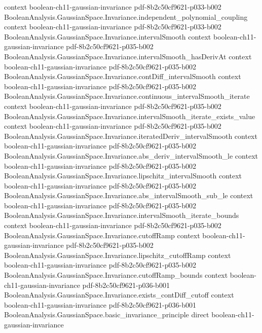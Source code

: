 \begin{theorem}
  {context}
  {boolean-ch11-gaussian-invariance}
  {pdf-8b2c50cf9621-p033-b002}
\proofstep
  {BooleanAnalysis.GaussianSpace.Invariance.independent_polynomial_coupling}
  {context}
  {boolean-ch11-gaussian-invariance}
  {pdf-8b2c50cf9621-p033-b002}
\proofstep
  {BooleanAnalysis.GaussianSpace.Invariance.intervalSmooth}
  {context}
  {boolean-ch11-gaussian-invariance}
  {pdf-8b2c50cf9621-p035-b002}
\proofstep
  {BooleanAnalysis.GaussianSpace.Invariance.intervalSmooth_hasDerivAt}
  {context}
  {boolean-ch11-gaussian-invariance}
  {pdf-8b2c50cf9621-p035-b002}
\proofstep
  {BooleanAnalysis.GaussianSpace.Invariance.contDiff_intervalSmooth}
  {context}
  {boolean-ch11-gaussian-invariance}
  {pdf-8b2c50cf9621-p035-b002}
\proofstep
  {BooleanAnalysis.GaussianSpace.Invariance.continuous_intervalSmooth_iterate}
  {context}
  {boolean-ch11-gaussian-invariance}
  {pdf-8b2c50cf9621-p035-b002}
\proofstep
  {BooleanAnalysis.GaussianSpace.Invariance.intervalSmooth_iterate_exists_value}
  {context}
  {boolean-ch11-gaussian-invariance}
  {pdf-8b2c50cf9621-p035-b002}
\proofstep
  {BooleanAnalysis.GaussianSpace.Invariance.iteratedDeriv_intervalSmooth}
  {context}
  {boolean-ch11-gaussian-invariance}
  {pdf-8b2c50cf9621-p035-b002}
\proofstep
  {BooleanAnalysis.GaussianSpace.Invariance.abs_deriv_intervalSmooth_le}
  {context}
  {boolean-ch11-gaussian-invariance}
  {pdf-8b2c50cf9621-p035-b002}
\proofstep
  {BooleanAnalysis.GaussianSpace.Invariance.lipschitz_intervalSmooth}
  {context}
  {boolean-ch11-gaussian-invariance}
  {pdf-8b2c50cf9621-p035-b002}
\proofstep
  {BooleanAnalysis.GaussianSpace.Invariance.abs_intervalSmooth_sub_le}
  {context}
  {boolean-ch11-gaussian-invariance}
  {pdf-8b2c50cf9621-p035-b002}
\proofstep
  {BooleanAnalysis.GaussianSpace.Invariance.intervalSmooth_iterate_bounds}
  {context}
  {boolean-ch11-gaussian-invariance}
  {pdf-8b2c50cf9621-p035-b002}
\proofstep
  {BooleanAnalysis.GaussianSpace.Invariance.cutoffRamp}
  {context}
  {boolean-ch11-gaussian-invariance}
  {pdf-8b2c50cf9621-p035-b002}
\proofstep
  {BooleanAnalysis.GaussianSpace.Invariance.lipschitz_cutoffRamp}
  {context}
  {boolean-ch11-gaussian-invariance}
  {pdf-8b2c50cf9621-p035-b002}
\proofstep
  {BooleanAnalysis.GaussianSpace.Invariance.cutoffRamp_bounds}
  {context}
  {boolean-ch11-gaussian-invariance}
  {pdf-8b2c50cf9621-p036-b001}
\proofstep
  {BooleanAnalysis.GaussianSpace.Invariance.exists_contDiff_cutoff}
  {context}
  {boolean-ch11-gaussian-invariance}
  {pdf-8b2c50cf9621-p036-b001}
\proofstep
  {BooleanAnalysis.GaussianSpace.basic_invariance_principle}
  {direct}
  {boolean-ch11-gaussian-invariance}

\end{theorem}
